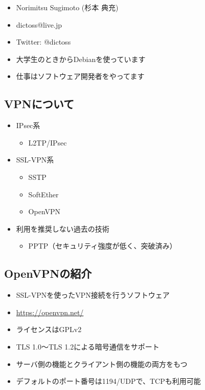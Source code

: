 \documentclass[mingoth,a4paper]{jsarticle}
\begin{document}
\begin{itemize}
\item Norimitsu Sugimoto (杉本 典充)
\item dictoss@live.jp
\item Twitter: @dictoss
\item 大学生のときからDebianを使っています
\item 仕事はソフトウェア開発者をやってます
\end{itemize}


\subsection{VPNについて}

\begin{itemize}
\item IPsec系
  \begin{itemize}
  \item L2TP/IPsec
  \end{itemize}
\item SSL-VPN系
  \begin{itemize}
  \item SSTP
  \item SoftEther
  \item OpenVPN
  \end{itemize}
\item 利用を推奨しない過去の技術
  \begin{itemize}
  \item PPTP（セキュリティ強度が低く、突破済み）
  \end{itemize}
\end{itemize}

\newpage

\subsection{OpenVPNの紹介}

\begin{itemize}
\item SSL-VPNを使ったVPN接続を行うソフトウェア
\item \url{https://openvpn.net/}
\item ライセンスはGPLv2
\item TLS 1.0〜TLS 1.2による暗号通信をサポート
\item サーバ側の機能とクライアント側の機能の両方をもつ
\item デフォルトのポート番号は1194/UDPで、TCPも利用可能
\end{itemize}
\end{document}
